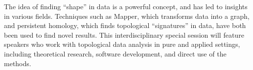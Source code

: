 The idea of finding ``shape'' in data is a powerful concept, and has led to insights in various fields. Techniques such as Mapper, which transforms data into a graph, and persistent homology, which finds topological ``signatures'' in data, have both been used to find novel results. This interdisciplinary special session will feature speakers who work with topological data analysis in pure and applied settings, including theoretical research, software development, and direct use of the methods.